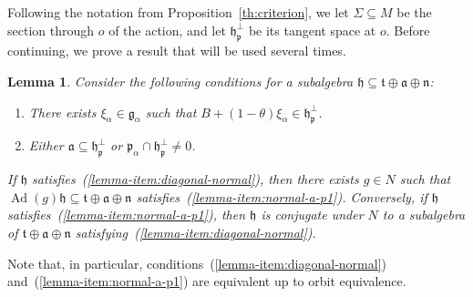 \documentclass[12pt, a4paper]{amsart}
\newcommand{\g}{\mathfrak}
\newcommand{\Ad}{\operatorname{Ad}}
\newtheorem{lemma}[theorem]{Lemma}
\theoremstyle{definition}
\begin{document}
Following the notation from Proposition~\ref{th:criterion},
we let $\Sigma\subseteq M$ be the section through $o$ of the action, and let $\g{h}_{\g{p}}^\perp$ be its tangent space at $o$.
Before continuing, we prove a result that will be used several times.


\begin{lemma}\label{lemma:equivalence-B+galpha}
Consider the following conditions for a subalgebra $\g{h}\subseteq\g{t}\oplus\g{a}\oplus\g{n}$:
\begin{enumerate}[{\rm (i)}]
\item\label{lemma-item:diagonal-normal} There exists $\xi_\alpha\in\g{g}_\alpha$ such that $B+(1-\theta)\xi_\alpha\in\g{h}_\g{p}^\perp$.
\item\label{lemma-item:normal-a-p1} Either $\g{a}\subseteq\g{h}_\g{p}^\perp$ or $\g{p}_\alpha\cap\g{h}_\g{p}^\perp\neq 0$.
\end{enumerate}
If $\g{h}$ satisfies~\textup{(\ref{lemma-item:diagonal-normal})}, then there exists $g\in N$
such that $\Ad(g)\g{h}\subseteq\g{t}\oplus\g{a}\oplus\g{n}$ satisfies~\textup{(\ref{lemma-item:normal-a-p1})}.
Conversely, if $\g{h}$ satisfies~\textup{(\ref{lemma-item:normal-a-p1})}, then $\g{h}$ is conjugate
under $N$ to a subalgebra of $\g{t}\oplus\g{a}\oplus\g{n}$ satisfying~\textup{(\ref{lemma-item:diagonal-normal})}.
\end{lemma}

Note that, in particular, conditions~(\ref{lemma-item:diagonal-normal})
and~(\ref{lemma-item:normal-a-p1}) are equivalent up to orbit equivalence.
\end{document}
